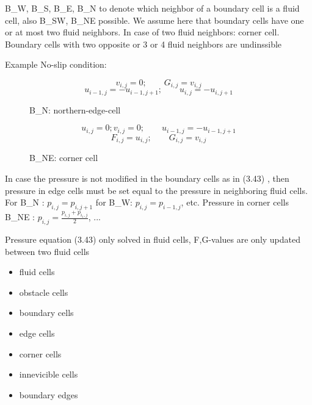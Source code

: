 \documentclass[a4paper,11pt]{scrartcl}
\begin{document}
B\_W, B\_S, B\_E, B\_N to denote which neighbor of a boundary cell is a fluid cell, also B\_SW, B\_NE possible. We assume here that boundary cells have one or at most two fluid neighbors. In case of two fluid neighbors: corner cell. Boundary cells with two opposite or 3 or 4 fluid neighbors are undinssible %

Example No-slip condition:
\begin{figure}[H]
	\centering
	\[ v_{i,j} = 0; \qquad G_{i,j} = v_{i,j} \]
	\[ u_{i-1,j} = -u_{i-1,j+1}; \qquad u_{i,j} = - u_{i,j+1} \]
	\renewcommand{\thefigure}{TODO}
	\caption{B\_N: northern-edge-cell}
	\label{fig:disc-freesplipb}
\end{figure}

\begin{figure}[H]
	\centering
	\[ u_{i,j} = 0; v_{i,j} = 0; \qquad u_{i-1,j} = - u_{i-1,j+1} \]
	\[ F_{i,j} = u_{i,j}; \qquad G_{i,j} = v_{i,j} \]
	\renewcommand{\thefigure}{3.53}
	\caption{B\_NE: corner cell}
	\label{fig:disc-freesplipb}
\end{figure}

In case the pressure is not modified in the boundary cells as in (3.43) %
, then pressure in edge cells must be set equal to the pressure in neighboring fluid cells. For B\_N : $p_{i,j} = p_{i,j+1}$ for B\_W: $p_{i,j} = p_{i-1,j}$, etc. Pressure in corner cells B\_NE : $p_{i,j} = \frac{p_{i,j} + p_{i_1,j}}{2}$, ...

Pressure equation (3.43) %
only solved in fluid cells, F,G-values are only updated between two fluid cells
\begin{itemize}
	\item fluid cells
	\item obstacle cells
	\item boundary cells
	\item edge cells
	\item corner cells
	\item innevicible cells
	\item boundary edges
\end{itemize}
\end{document}
